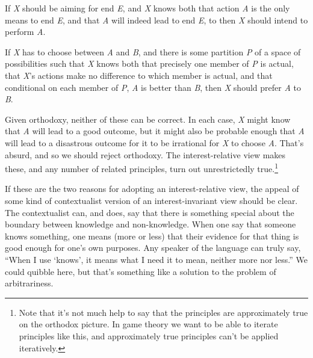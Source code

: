 \documentclass[
  10pt,
  letterpaper,
  twoside]{scrbook}
\providecommand{\tightlist}{%
  \setlength{\itemsep}{0pt}\setlength{\parskip}{0pt}}\usepackage{longtable,booktabs,array}
\begin{document}
\begin{description}
\tightlist
\item[Means-End Rationality]
If \emph{X} should be aiming for end \emph{E}, and \emph{X} knows both
that action \emph{A} is the only means to end \emph{E}, and that
\emph{A} will indeed lead to end \emph{E}, to then \emph{X} should
intend to perform \emph{A}.
\item[Strict Dominance Reasoning]
If \emph{X} has to choose between \emph{A} and \emph{B}, and there is
some partition \emph{P} of a space of possibilities such that \emph{X}
knows both that precisely one member of \emph{P} is actual, that
\emph{X}'s actions make no difference to which member is actual, and
that conditional on each member of \emph{P}, \emph{A} is better than
\emph{B}, then \emph{X} should prefer \emph{A} to \emph{B}.
\end{description}

Given orthodoxy, neither of these can be correct. In each case, \emph{X}
might know that \emph{A} will lead to a good outcome, but it might also
be probable enough that \emph{A} will lead to a disastrous outcome for
it to be irrational for \emph{X} to choose \emph{A}. That's absurd, and
so we should reject orthodoxy. The interest-relative view makes these,
and any number of related principles, turn out unrestrictedly
true.\footnote{Note that it's not much help to say that the principles
  are approximately true on the orthodox picture. In game theory we want
  to be able to iterate principles like this, and approximately true
  principles can't be applied iteratively.}

If these are the two reasons for adopting an interest-relative view, the
appeal of some kind of contextualist version of an interest-invariant
view should be clear. The contextualist can, and does, say that there is
something special about the boundary between knowledge and
non-knowledge. When one say that someone knows something, one means
(more or less) that their evidence for that thing is good enough for
one's own purposes. Any speaker of the language can truly say, ``When I
use `knows', it means what I need it to mean, neither more nor less.''
We could quibble here, but that's something like a solution to the
problem of arbitrariness.
\end{document}
